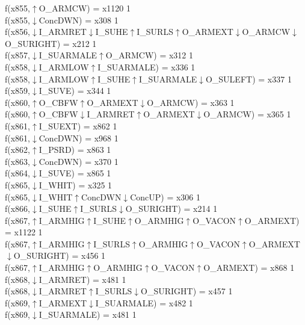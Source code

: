 f(x855,$\uparrow$O\_ARMCW) = x1120 {1} \\
f(x855,$\downarrow$ConcDWN) = x308 {1} \\
f(x856,$\downarrow$I\_ARMRET$\downarrow$I\_SUHE$\uparrow$I\_SURLS$\uparrow$O\_ARMEXT$\downarrow$O\_ARMCW$\downarrow$O\_SURIGHT) = x212 {1} \\
f(x857,$\downarrow$I\_SUARMALE$\uparrow$O\_ARMCW) = x312 {1} \\
f(x858,$\downarrow$I\_ARMLOW$\uparrow$I\_SUARMALE) = x336 {1} \\
f(x858,$\downarrow$I\_ARMLOW$\uparrow$I\_SUHE$\uparrow$I\_SUARMALE$\downarrow$O\_SULEFT) = x337 {1} \\
f(x859,$\downarrow$I\_SUVE) = x344 {1} \\
f(x860,$\uparrow$O\_CBFW$\uparrow$O\_ARMEXT$\downarrow$O\_ARMCW) = x363 {1} \\
f(x860,$\uparrow$O\_CBFW$\downarrow$I\_ARMRET$\uparrow$O\_ARMEXT$\downarrow$O\_ARMCW) = x365 {1} \\
f(x861,$\uparrow$I\_SUEXT) = x862 {1} \\
f(x861,$\downarrow$ConcDWN) = x968 {1} \\
f(x862,$\uparrow$I\_PSRD) = x863 {1} \\
f(x863,$\downarrow$ConcDWN) = x370 {1} \\
f(x864,$\downarrow$I\_SUVE) = x865 {1} \\
f(x865,$\downarrow$I\_WHIT) = x325 {1} \\
f(x865,$\downarrow$I\_WHIT$\uparrow$ConcDWN$\downarrow$ConcUP) = x306 {1} \\
f(x866,$\downarrow$I\_SUHE$\uparrow$I\_SURLS$\downarrow$O\_SURIGHT) = x214 {1} \\
f(x867,$\uparrow$I\_ARMHIG$\uparrow$I\_SUHE$\uparrow$O\_ARMHIG$\uparrow$O\_VACON$\uparrow$O\_ARMEXT) = x1122 {1} \\
f(x867,$\uparrow$I\_ARMHIG$\uparrow$I\_SURLS$\uparrow$O\_ARMHIG$\uparrow$O\_VACON$\uparrow$O\_ARMEXT$\downarrow$O\_SURIGHT) = x456 {1} \\
f(x867,$\uparrow$I\_ARMHIG$\uparrow$O\_ARMHIG$\uparrow$O\_VACON$\uparrow$O\_ARMEXT) = x868 {1} \\
f(x868,$\downarrow$I\_ARMRET) = x481 {1} \\
f(x868,$\downarrow$I\_ARMRET$\uparrow$I\_SURLS$\downarrow$O\_SURIGHT) = x457 {1} \\
f(x869,$\uparrow$I\_ARMEXT$\downarrow$I\_SUARMALE) = x482 {1} \\
f(x869,$\downarrow$I\_SUARMALE) = x481 {1} \\

